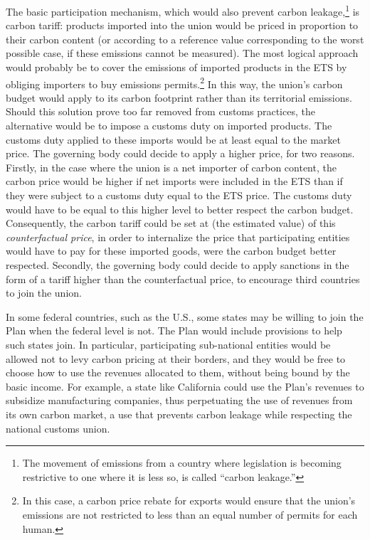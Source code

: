 \documentclass[a5paper,english,openany]{memoir}
\begin{document}
The basic participation mechanism, which would also prevent carbon leakage,\footnote{The movement of emissions from a country where legislation is becoming restrictive to one where it is less so, is called ``carbon leakage.''} is carbon tariff: products imported into the union would be priced in proportion to their carbon content (or according to a reference value corresponding to the worst possible case, if these emissions cannot be measured). The most logical approach would probably be to cover the emissions of imported products in the ETS by obliging importers to buy emissions permits.\footnote{In this case, a carbon price rebate for exports would ensure that the union's emissions are not restricted to less than an equal number of permits for each human.} In this way, the union's carbon budget would apply to its carbon footprint rather than its territorial emissions. Should this solution prove too far removed from customs practices, the alternative would be to impose a customs duty on imported products. The customs duty applied to these imports would be at least equal to the market price. The governing body could decide to apply a higher price, for two reasons. Firstly, in the case where the union is a net importer of carbon content, the carbon price would be higher if net imports were included in the ETS than if they were subject to a customs duty equal to the ETS price. The customs duty would have to be equal to this higher level to better respect the carbon budget. Consequently, the carbon tariff could be set at (the estimated value) of this \textit{counterfactual price}, in order to internalize the price that participating entities would have to pay for these imported goods, were the carbon budget better respected. Secondly, the governing body could decide to apply sanctions in the form of a tariff higher than the counterfactual price, to encourage third countries to join the union. 

In some federal countries, such as the U.S., some states may be willing to join the Plan when the federal level is not. The Plan would include provisions to help such states join. In particular, participating sub-national entities would be allowed not to levy carbon pricing at their borders, and they would be free to choose how to use the revenues allocated to them, without being bound by the basic income. 
For example, a state like California could use the Plan's revenues to subsidize manufacturing companies, thus perpetuating the use of revenues from its own carbon market, a use that prevents carbon leakage while respecting the national customs union.
\end{document}
